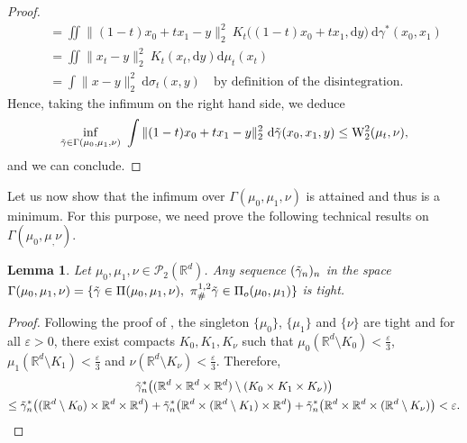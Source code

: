 \documentclass[twoside]{article}
\newtheorem{lemma}{Lemma}
\newcommand{\W}{\mathrm{W}}
\begin{document}
\begin{proof}
\begin{equation}
\begin{aligned}
            &\quad = \iint \|(1-t)x_0 + tx_1 - y\|_2^2\ K_t\big((1-t)x_0+tx_1, \mathrm{d}y\big)\ \mathrm{d}\gamma^*(x_0,x_1) \\
            &\quad = \iint \|x_t-y\|_2^2\ K_t(x_t,\mathrm{d}y)\mathrm{d}\mu_t(x_t) \\
            &\quad = \int \|x-y\|_2^2\ \mathrm{d}\sigma_t(x,y) \quad \text{by definition of the disintegration.}
        \end{aligned}
    \end{equation}
    Hence, taking the infimum on the right hand side, we deduce
    \begin{equation}
        \inf_{\Tilde{\gamma}\in\Gamma(\mu_0, \mu_1, \nu)}\ \int \|(1-t)x_0 +tx_1 - y\|_2^2\ \mathrm{d}\Tilde{\gamma}(x_0,x_1,y) \le \W_2^2(\mu_t, \nu),
    \end{equation}
    and we can conclude.
\end{proof}

Let us now show that the infimum over $\Gamma(\mu_0,\mu_1,\nu)$ is attained and thus is a minimum. For this purpose, we need prove the following technical results on $\Gamma(\mu_0,\mu_,\nu)$.

\begin{lemma} \label{lemma:gamma_tight}
    Let $\mu_0,\mu_1,\nu\in\mathcal{P}_2(\mathbb{R}^d)$. Any sequence $(\Tilde{\gamma}_n)_n$ in the space $\Gamma(\mu_0,\mu_1,\nu)=\{\Tilde{\gamma}\in\Pi(\mu_0,\mu_1,\nu),\ \pi^{1,2}_\#\Tilde{\gamma}\in\Pi_o(\mu_0,\mu_1)\}$ is tight.
\end{lemma}

\begin{proof}
    Following the proof of \citep[Theorem 1.7]{santambrogio2015optimal}, the singleton $\{\mu_0\}$, $\{\mu_1\}$ and $\{\nu\}$ are tight and for all $\varepsilon>0$, there exist compacts $K_0,K_1,K_\nu$ such that $\mu_0(\mathbb{R}^d\setminus K_0) < \frac{\varepsilon}{3}$, $\mu_1(\mathbb{R}^d\setminus K_1) < \frac{\varepsilon}{3}$ and $\nu(\mathbb{R}^d\setminus K_\nu) < \frac{\varepsilon}{3}$. Therefore, 
    \begin{multline}
            \Tilde{\gamma}^*_{n}\big((\mathbb{R}^d\times\mathbb{R}^d\times \mathbb{R}^d)\setminus (K_0\times K_1 \times K_\nu)\big) \\ \le \Tilde{\gamma}_{n}^*\big((\mathbb{R}^d\setminus K_0)\times \mathbb{R}^d \times \mathbb{R}^d\big) + \Tilde{\gamma}_{n}^*\big(\mathbb{R}^d \times (\mathbb{R}^d\setminus K_1)\times \mathbb{R}^d\big) + \Tilde{\gamma}_{n}^*\big(\mathbb{R}^d\times\mathbb{R}^d \times (\mathbb{R}^d\setminus K_\nu)\big) < \varepsilon.
    \end{multline}
\end{proof}
\end{document}
